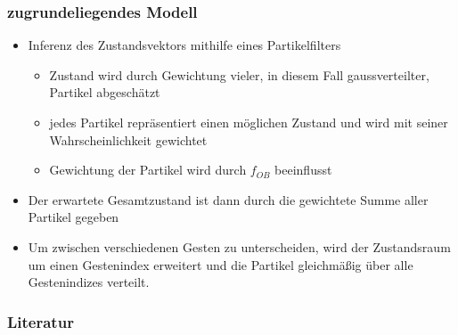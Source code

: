 \documentclass{beamer}
\begin{document}
\begin{frame}\frametitle{zugrundeliegendes Modell}
\begin{itemize}
\item Inferenz des Zustandsvektors mithilfe eines Partikelfilters
\begin{itemize}
\item Zustand wird durch Gewichtung vieler, in diesem Fall gaussverteilter, Partikel abgeschätzt
\item jedes Partikel repräsentiert einen möglichen Zustand und wird mit seiner Wahrscheinlichkeit gewichtet
\item Gewichtung der Partikel wird durch $f_{OB}$ beeinflusst
\end{itemize}
\item Der erwartete Gesamtzustand ist dann durch die gewichtete Summe aller Partikel gegeben
\item Um zwischen verschiedenen Gesten zu unterscheiden, wird der Zustandsraum um einen Gestenindex erweitert und die Partikel gleichmäßig über alle Gestenindizes verteilt.
\end{itemize}
\end{frame}

\begin{frame}\frametitle{Literatur}



\end{frame}
\end{document}
